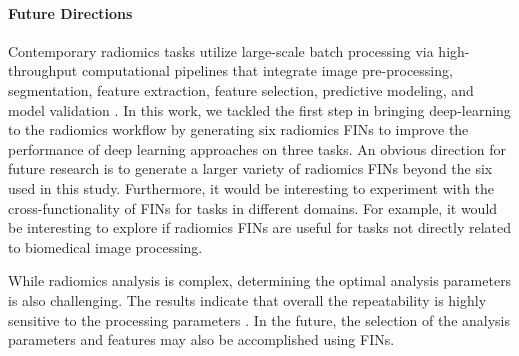 \documentclass{article}
\begin{document}


\paragraph*{Future Directions}

Contemporary radiomics tasks utilize large-scale batch processing via high-throughput computational pipelines that integrate image pre-processing, segmentation, feature extraction, feature selection, predictive modeling, and model validation \cite{TRAVERSO20181143}. In this work, we tackled the first step in bringing deep-learning to the radiomics workflow by generating six radiomics FINs to improve the performance of deep learning approaches on three tasks. An obvious direction for future research is to generate a larger variety of radiomics FINs beyond the six used in this study. Furthermore, it would be interesting to experiment with the cross-functionality of FINs for tasks in different domains. For example, it would be interesting to explore if radiomics FINs are useful for tasks not directly related to biomedical image processing.

While radiomics analysis is complex, determining the optimal analysis parameters is also challenging. The results indicate that overall the repeatability is highly sensitive to the processing parameters \cite{schwier2019repeatability}. In the future, the selection of the analysis parameters and features may also be accomplished using FINs. 
\end{document}
